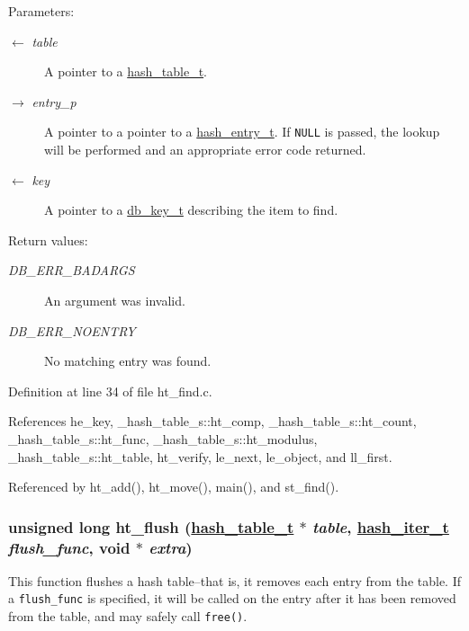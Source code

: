 \begin{Desc}
\item[Parameters:]
\begin{description}
\item[\mbox{$\leftarrow$} {\em table}]A pointer to a \hyperlink{group__dbprim__hash_ga1}{hash\_\-table\_\-t}. \item[\mbox{$\rightarrow$} {\em entry\_\-p}]A pointer to a pointer to a \hyperlink{group__dbprim__hash_ga2}{hash\_\-entry\_\-t}. If {\tt NULL} is passed, the lookup will be performed and an appropriate error code returned. \item[\mbox{$\leftarrow$} {\em key}]A pointer to a \hyperlink{group__dbprim_ga0}{db\_\-key\_\-t} describing the item to find.\end{description}
\end{Desc}
\begin{Desc}
\item[Return values:]
\begin{description}
\item[{\em DB\_\-ERR\_\-BADARGS}]An argument was invalid. \item[{\em DB\_\-ERR\_\-NOENTRY}]No matching entry was found.\end{description}
\end{Desc}


Definition at line 34 of file ht\_\-find.c.

References he\_\-key, \_\-hash\_\-table\_\-s::ht\_\-comp, \_\-hash\_\-table\_\-s::ht\_\-count, \_\-hash\_\-table\_\-s::ht\_\-func, \_\-hash\_\-table\_\-s::ht\_\-modulus, \_\-hash\_\-table\_\-s::ht\_\-table, ht\_\-verify, le\_\-next, le\_\-object, and ll\_\-first.

Referenced by ht\_\-add(), ht\_\-move(), main(), and st\_\-find().\hypertarget{group__dbprim__hash_ga15}{
\subsubsection[ht\_\-flush]{\setlength{\rightskip}{0pt plus 5cm}unsigned long ht\_\-flush (\hyperlink{struct__hash__table__s}{hash\_\-table\_\-t} $\ast$ {\em table}, \hyperlink{group__dbprim__hash_ga3}{hash\_\-iter\_\-t} {\em flush\_\-func}, void $\ast$ {\em extra})}}
\label{group__dbprim__hash_ga15}


This function flushes a hash table--that is, it removes each entry from the table. If a {\tt flush\_\-func} is specified, it will be called on the entry after it has been removed from the table, and may safely call {\tt free()}.


